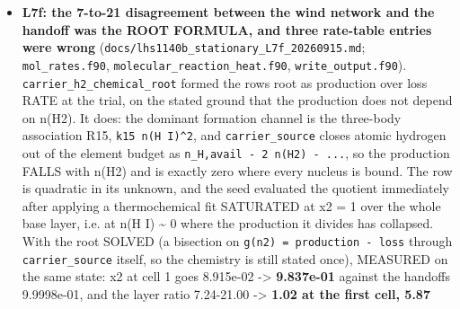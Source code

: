 \documentclass[english,a4paper]{my_memo}
\begin{document}
\begin{itemize}
  0.09 percent of the loss. What holds BOTH columns is neither: every carrier
  relaxation of both runs ends on the composition movement bound and never on
  its own residual, the bound is cut 5.0e-03 -\textgreater{} 2.5e-03 -\textgreater{} 1.25e-03 -\textgreater{} floor
  1.0e-03 with the drift falling in proportion, and the cell that ATTAINS the
  bound is the H2 front (cell 231, cell 225) and not the cell that refuses.
  \texttt{HeH0.083} is STALLED (worst row flat 2.41e-02 to 2.46e-02 for ten passes)
  and \texttt{HeH0.55} has NOT ARRIVED (its refusing cell migrates 233 -\textgreater{} 306 at the
  pace of the x2 = 1e-02 radius). Nothing was changed for that measurement and
  no cell was excluded from certification; the three well-mixed cases are
  recorded as NOT SOLVED with that reason, and the remedy is proposed as item
  L22. MEASURED and recorded for the next judgment: the relaxation\textquotesingle s interval
  is the cell\textquotesingle s crossing time and carries no chemical time (\texttt{dr/\textbar{}v\textbar{}} is 21 to
  76 times the H2 chemical time at cells 194/218/250/280) while the operator
  may subdivide it only 8 times.
\item
  \textbf{L7f: the 7-to-21 disagreement between the wind network and the handoff was
  the ROOT FORMULA, and three rate-table entries were wrong}
  (\texttt{docs/lhs1140b\_stationary\_L7f\_20260915.md}; \texttt{mol\_rates.f90},
  \texttt{molecular\_reaction\_heat.f90}, \texttt{write\_output.f90}). \texttt{carrier\_h2\_chemical\_root}
  formed the row\textquotesingle s root as production over loss RATE at the trial, on the
  stated ground that the production does not depend on n(H2). It does: the
  dominant formation channel is the three-body association R15, \texttt{k15\ n(H\ I)\^{}2},
  and \texttt{carrier\_source} closes atomic hydrogen out of the element budget as
  \texttt{n\_H,avail\ -\ 2\ n(H2)\ -\ ...}, so the production FALLS with n(H2) and is
  exactly zero where every nucleus is bound. The row is quadratic in its
  unknown, and the seed evaluated the quotient immediately after applying a
  thermochemical fit SATURATED at x2 = 1 over the whole base layer, i.e. at
  n(H I) \textasciitilde{} 0 where the production it divides has collapsed. With the root
  SOLVED (a bisection on \texttt{g(n2)\ =\ production\ -\ loss} through \texttt{carrier\_source}
  itself, so the chemistry is still stated once), MEASURED on the same state:
  x2 at cell 1 goes 8.915e-02 -\textgreater{} \textbf{9.837e-01} against the handoff\textquotesingle s
  9.9998e-01, and the layer ratio 7.24-21.00 -\textgreater{} \textbf{1.02 at the first cell, 5.87
}
\end{itemize}
\end{document}
